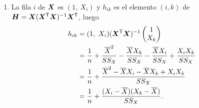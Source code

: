 \begin{demostracion}
\begin{enumerate}
\begin{align*}
        &= \media{Y}-\media{X}\,\frac{\sumi X_iY_i-n\media{X}\,\media{Y}}{\SSX} \\
        &= \media{Y}-\est{\beta}_1\media{X} .
      \end{align*}
    \item La fila $i$ de $\bm{X}$ es $(1,\ X_i)$ y $h_{ik}$ es el elemento $(i,k)$ de
      $\bm{H}=\bm{X}(\bm{X}^{\mathsf{T}}\bm{X})^{-1}\bm{X}^{\mathsf{T}}$, luego
      \begin{align*}
        h_{ik} &= (1,\ X_i)(\bm{X}^{\mathsf{T}}\bm{X})^{-1}\begin{pmatrix} 1\\ X_k \end{pmatrix} \\
        &= \frac1n+\frac{\overline{X}^2}{SS_X}-\frac{\overline{X}X_k}{SS_X}
           -\frac{\overline{X}X_i}{SS_X}+\frac{X_iX_k}{SS_X} \\
        &= \frac1n+\frac{\overline{X}^2-\overline{X}X_i-\overline{X}X_k+X_iX_k}{SS_X} \\
        &= \frac1n+\frac{(X_i-\overline{X})(X_k-\overline{X})}{SS_X} .
      \end{align*}
  \end{enumerate}
\end{demostracion}

